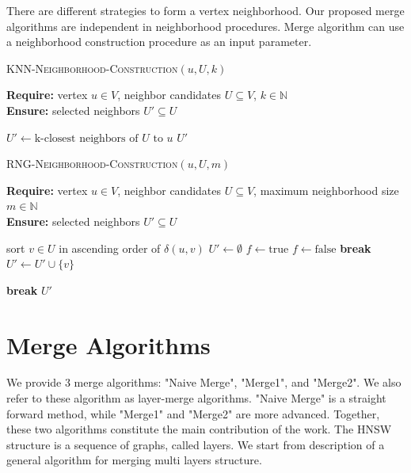 \documentclass{article}
\begin{document}
There are different strategies to form a vertex neighborhood. Our proposed merge algorithms are independent in neighborhood procedures. Merge algorithm can use a neighborhood construction procedure as an input parameter.

\begin{algorithm}
\caption{\textsc{KNN-Neighborhood-Construction}$(u,U, k)$}
\label{alg:knntrategy}
\textbf{Require:} vertex $u \in V$, neighbor candidates $U \subseteq V$, $k \in \mathbb{N} $\\
\textbf{Ensure:} selected neighbors $U' \subseteq U$
\begin{algorithmic}[1]
    
    \State $U' \gets \text{k-closest neighbors of } U \text{ to } u$
    \State \Return $U'$
\end{algorithmic}
\end{algorithm}

\begin{algorithm}
\caption{\textsc{RNG-Neighborhood-Construction}$(u, U, m)$}
\label{alg:rngstrategy}
\textbf{Require:} vertex $u \in V$, neighbor candidates $U \subseteq V$, maximum neighborhood size $m \in \mathbb{N}$\\
\textbf{Ensure:} selected neighbors $U' \subseteq U$
\begin{algorithmic}[1]
    \State sort $v \in U$ in ascending order of $\delta(u,v)$
    \State $U' \gets \emptyset$
        \State $f \gets \text{true}$
                \State $f \gets \text{false}$
                \State \textbf{break}
            \EndIf
        \EndFor
            \State $U' \gets U' \cup \{v\}$
        \EndIf

            \State \textbf{break}
        \EndIf
    \EndFor
    \State \Return $U'$
\end{algorithmic}
\end{algorithm}

\section{Merge Algorithms}

We provide 3 merge algorithms: "Naive Merge", "Merge1", and "Merge2". We also refer to these algorithm as layer-merge algorithms. "Naive Merge" is a straight forward method, while "Merge1" and "Merge2" are more advanced. Together, these two algorithms constitute the main contribution of the work. The HNSW structure is a sequence of graphs, called layers. We start from description of a general algorithm for merging multi layers structure.
\end{document}
